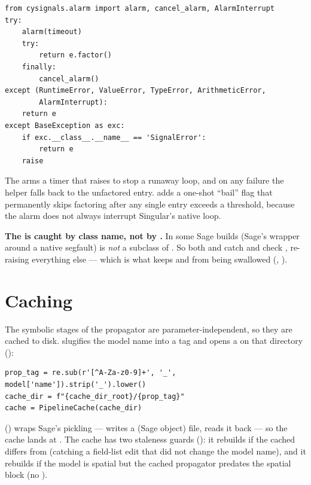 \begin{lstlisting}
from cysignals.alarm import alarm, cancel_alarm, AlarmInterrupt
try:
    alarm(timeout)
    try:
        return e.factor()
    finally:
        cancel_alarm()
except (RuntimeError, ValueError, TypeError, ArithmeticError,
        AlarmInterrupt):
    return e
except BaseException as exc:
    if exc.__class__.__name__ == 'SignalError':
        return e
    raise
\end{lstlisting}

The  arms a timer that raises  to stop a
runaway  loop, and on any failure the helper falls back to the
unfactored entry.  adds a one-shot ``bail'' flag that
permanently skips factoring after any single entry exceeds a threshold, because
the alarm does not always interrupt Singular's native loop.

\begin{gotcha}
\textbf{The   is caught by class name, not by
.} In some Sage builds  (Sage's wrapper around
a native segfault) is \emph{not} a subclass of . So both
 and  catch  and
check , re-raising everything
else --- which is what keeps  and  from
being swallowed (, ).
\end{gotcha}

\section{Caching}

The symbolic stages of the propagator are parameter-independent, so they are
cached to disk.  slugifies the model name into a tag and
opens a  on that directory
():

\begin{lstlisting}
prop_tag = re.sub(r'[^A-Za-z0-9]+', '_', model['name']).strip('_').lower()
cache_dir = f"{cache_dir_root}/{prop_tag}"
cache = PipelineCache(cache_dir)
\end{lstlisting}

 () wraps Sage's pickling ---
 writes a  (Sage object) file,  reads it back ---
so the cache lands at . The cache has
two staleness guards (): it rebuilds if the
cached  differs from  (catching a field-list edit that
did not change the model name), and it rebuilds if the model is spatial but the
cached propagator predates the spatial block (no ).

